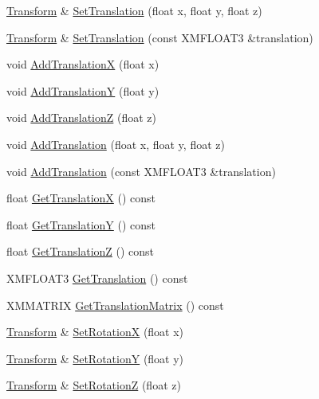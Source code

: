 \begin{DoxyCompactItemize}
\item 
\hyperlink{structmage_1_1_transform}{Transform} \& \hyperlink{structmage_1_1_transform_aaf6cac5a1bacfbadb3f76353a7339c2e}{Set\+Translation} (float x, float y, float z)
\item 
\hyperlink{structmage_1_1_transform}{Transform} \& \hyperlink{structmage_1_1_transform_a9a97b56c7ec1268c071233799d998c4f}{Set\+Translation} (const X\+M\+F\+L\+O\+A\+T3 \&translation)
\item 
void \hyperlink{structmage_1_1_transform_aa4b8469fa07ab4ad3b50aaa34389967f}{Add\+TranslationX} (float x)
\item 
void \hyperlink{structmage_1_1_transform_aef8f3728f6d6d55e69689cff2af4c26f}{Add\+TranslationY} (float y)
\item 
void \hyperlink{structmage_1_1_transform_a0553f72a6fcf38128d2201d54584f079}{Add\+TranslationZ} (float z)
\item 
void \hyperlink{structmage_1_1_transform_a2e981e670eea4d731bda4ee68f0b7fae}{Add\+Translation} (float x, float y, float z)
\item 
void \hyperlink{structmage_1_1_transform_a1125e444c9537e09a328f37a47e61b58}{Add\+Translation} (const X\+M\+F\+L\+O\+A\+T3 \&translation)
\item 
float \hyperlink{structmage_1_1_transform_a171525f6ba157e319646548f2c459395}{Get\+TranslationX} () const
\item 
float \hyperlink{structmage_1_1_transform_a7feba3c1d24a986e440dd6571edc14b2}{Get\+TranslationY} () const
\item 
float \hyperlink{structmage_1_1_transform_a023ce9ea6afaaa80776b4d43957964bf}{Get\+TranslationZ} () const
\item 
X\+M\+F\+L\+O\+A\+T3 \hyperlink{structmage_1_1_transform_aca74308060f244adf137676e79a9f6e5}{Get\+Translation} () const
\item 
X\+M\+M\+A\+T\+R\+IX \hyperlink{structmage_1_1_transform_a4f246a50de8bdfd1bd9dd8e07b7a8c01}{Get\+Translation\+Matrix} () const
\item 
\hyperlink{structmage_1_1_transform}{Transform} \& \hyperlink{structmage_1_1_transform_a11ad9d49ceb788e31954b3e32a16033f}{Set\+RotationX} (float x)
\item 
\hyperlink{structmage_1_1_transform}{Transform} \& \hyperlink{structmage_1_1_transform_a90216ae099ef51340b9392c89d12ecb6}{Set\+RotationY} (float y)
\item 
\hyperlink{structmage_1_1_transform}{Transform} \& \hyperlink{structmage_1_1_transform_aca3f1ea79f7559b0a1e59ac62e268df0}{Set\+RotationZ} (float z)

\end{DoxyCompactItemize}
